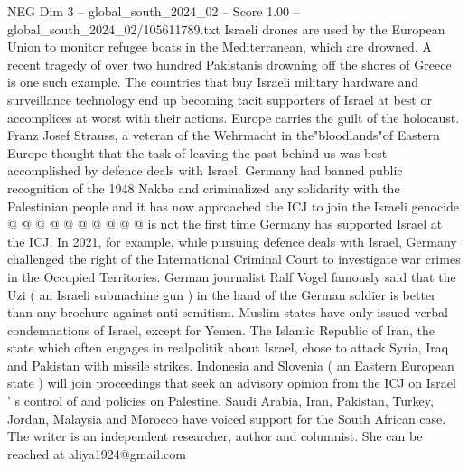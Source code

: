\begin{textsample}{NEG Dim 3 – global\_south\_2024\_02 – Score 1.00 – global\_south\_2024\_02/105611789.txt}
Israeli drones are used by the European Union to monitor refugee boats in the Mediterranean, which are drowned.
A recent tragedy of over two hundred Pakistanis drowning off the shores of Greece is one such example.
The countries that buy Israeli military hardware and surveillance technology end up becoming tacit supporters of Israel at best or accomplices at worst with their actions.
Europe carries the guilt of the holocaust.
Franz Josef Strauss, a veteran of the Wehrmacht in the"bloodlands"of Eastern Europe thought that the task of leaving the past behind us was best accomplished by defence deals with Israel.
Germany had banned public recognition of the 1948 Nakba and criminalized any solidarity with the Palestinian people and it has now approached the ICJ to join the Israeli genocide @ @ @ @ @ @ @ @ @ @ is not the first time Germany has supported Israel at the ICJ.
In 2021, for example, while pursuing defence deals with Israel, Germany challenged the right of the International Criminal Court to investigate war crimes in the Occupied Territories.
German journalist Ralf Vogel famously said that the Uzi ( an Israeli submachine gun ) in the hand of the German soldier is better than any brochure against anti-semitism.
Muslim states have only issued verbal condemnations of Israel, except for Yemen.
The Islamic Republic of Iran, the state which often engages in realpolitik about Israel, chose to attack Syria, Iraq and Pakistan with missile strikes.
Indonesia and Slovenia ( an Eastern European state ) will join proceedings that seek an advisory opinion from the ICJ on Israel ' s control of and policies on Palestine.
Saudi Arabia, Iran, Pakistan, Turkey, Jordan, Malaysia and Morocco have voiced support for the South African case.
The writer is an independent researcher, author and columnist.
She can be reached at aliya1924@gmail.com

\end{textsample}
